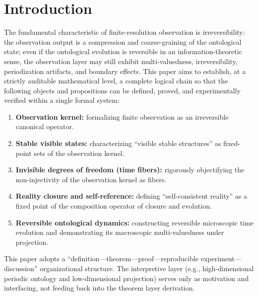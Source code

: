 \section{Introduction}

The fundamental characteristic of finite-resolution observation is irreversibility: the observation output is a compression and coarse-graining of the ontological state; even if the ontological evolution is reversible in an information-theoretic sense, the observation layer may still exhibit multi-valuedness, irreversibility, periodization artifacts, and boundary effects. This paper aims to establish, at a strictly auditable mathematical level, a complete logical chain so that the following objects and propositions can be defined, proved, and experimentally verified within a single formal system:
\begin{enumerate}
  \item \textbf{Observation kernel:} formalizing finite observation as an irreversible canonical operator.
  \item \textbf{Stable visible states:} characterizing ``visible stable structures'' as fixed-point sets of the observation kernel.
  \item \textbf{Invisible degrees of freedom (time fibers):} rigorously objectifying the non-injectivity of the observation kernel as fibers.
  \item \textbf{Reality closure and self-reference:} defining ``self-consistent reality'' as a fixed point of the composition operator of closure and evolution.
  \item \textbf{Reversible ontological dynamics:} constructing reversible microscopic time evolution and demonstrating its macroscopic multi-valuedness under projection.
\end{enumerate}

This paper adopts a ``definition—theorem—proof—reproducible experiment—discussion'' organizational structure. The interpretive layer (e.g., high-dimensional periodic ontology and low-dimensional projection) serves only as motivation and interfacing, not feeding back into the theorem layer derivation.
